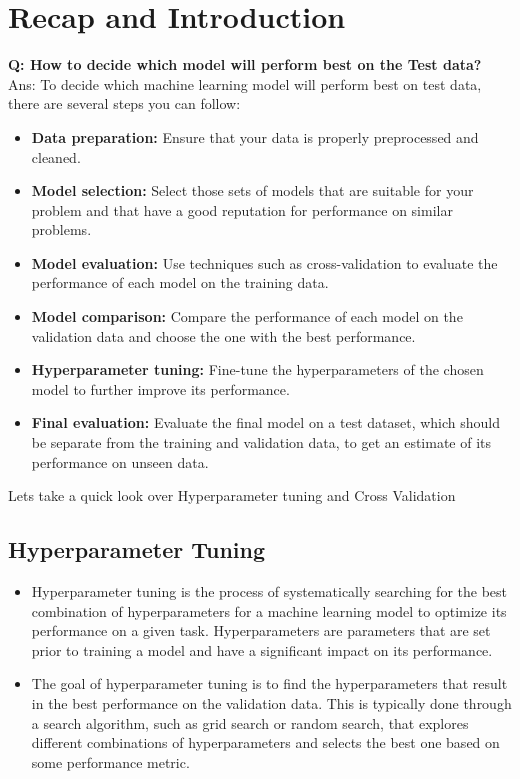 \documentclass[10pt]{article}
\begin{document}
	\MakeScribeTop

\section{Recap and Introduction}

\large{ \textbf{Q: How to decide which model will perform best on the Test data?}}\\
 Ans: To decide which machine learning model will perform best on test data, there are several steps you can follow:
 \begin{itemize}

\item \textbf{Data preparation:} Ensure that your data is properly preprocessed and cleaned.

\item \textbf{Model selection:} Select those sets of models that are suitable for your problem and that have a good reputation for performance on similar problems.

\item \textbf{Model evaluation:} Use techniques such as cross-validation to evaluate the performance of each model on the training data.

\item \textbf{Model comparison:} Compare the performance of each model on the validation data and choose the one with the best performance.

\item \textbf{Hyperparameter tuning:} Fine-tune the hyperparameters of the chosen model to further improve its performance.

\item \textbf{Final evaluation:} Evaluate the final model on a test dataset, which should be separate from the training and validation data, to get an estimate of its performance on unseen data.
 
 \end{itemize}

Lets take a quick look over Hyperparameter tuning and Cross Validation 

\subsection{Hyperparameter Tuning}

\begin{itemize}
    \item Hyperparameter tuning is the process of systematically searching for the best combination of hyperparameters for a machine learning model to optimize its performance on a given task. Hyperparameters are parameters that are set prior to training a model and have a significant impact on its performance. 
    \item The goal of hyperparameter tuning is to find the hyperparameters that result in the best performance on the validation data. This is typically done through a search algorithm, such as grid search or random search, that explores different combinations of hyperparameters and selects the best one based on some performance metric. 
\end{itemize}
\end{document}
